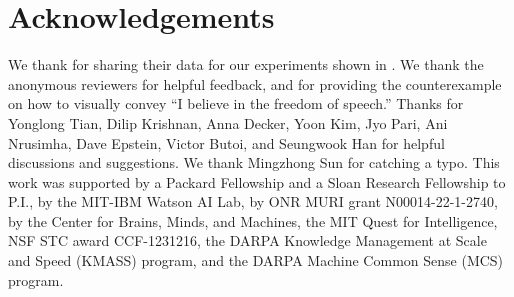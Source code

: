 \documentclass{article}
\newcommand{\jh}[1]{{\;\color{red}JH: #1}}
\theoremstyle{plain}
\theoremstyle{definition}
\theoremstyle{remark}
\begin{document}
\section*{Acknowledgements}

We thank \citeauthor{lindsey2014color} for sharing their data for our experiments shown in . We thank the anonymous reviewers for helpful feedback, and for providing the counterexample on how to visually convey ``I believe in the freedom of speech.'' Thanks for Yonglong Tian, Dilip Krishnan, Anna Decker, Yoon Kim, Jyo Pari, Ani Nrusimha, Dave Epstein, Victor Butoi, and Seungwook Han for helpful discussions and suggestions. We thank Mingzhong Sun for catching a typo. This work was supported by a Packard Fellowship and a Sloan Research Fellowship to P.I., by the MIT-IBM Watson AI Lab, by ONR MURI grant N00014-22-1-2740, by the Center for Brains, Minds, and Machines, the MIT Quest for Intelligence, NSF STC award CCF-1231216, the DARPA Knowledge Management at Scale and Speed (KMASS) program, and the DARPA Machine Common Sense (MCS) program.





{


}
\clearpage

\newpage
\appendix
\onecolumn

\end{document}
